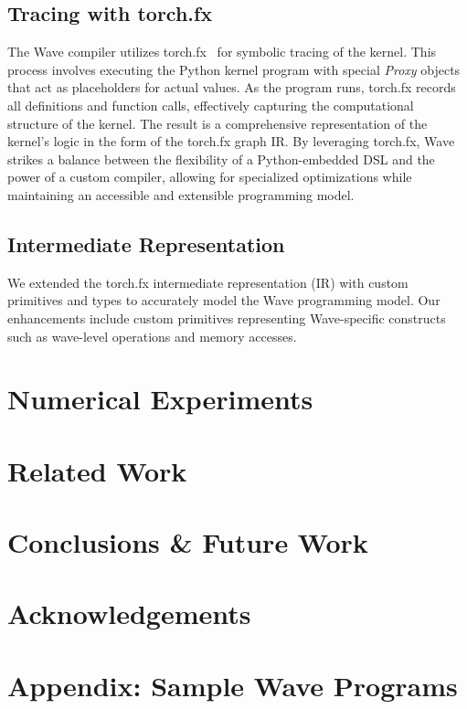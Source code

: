 \documentclass{article}
\begin{document}
\subsection{Tracing with torch.fx}

The Wave compiler utilizes torch.fx~\cite{reed2022torch} for symbolic tracing of the kernel. This process involves executing the Python kernel program with special \emph{Proxy} objects that act as placeholders for actual values. As the program runs, torch.fx records all definitions and function calls, effectively capturing the computational structure of the kernel. The result is a comprehensive representation of the kernel's logic in the form of the torch.fx graph IR. By leveraging torch.fx, Wave strikes a balance between the flexibility of a Python-embedded DSL and the power of a custom compiler, allowing for specialized optimizations while maintaining an accessible and extensible programming model.

\subsection{Intermediate Representation}
We extended the torch.fx intermediate representation (IR) with custom primitives and types to accurately model the Wave programming model. Our enhancements include custom primitives representing Wave-specific constructs such as wave-level operations and memory accesses.

\section{Numerical Experiments}
\label{section:numerical_experiments}

\section{Related Work}
\label{section:related_work}

\section{Conclusions \& Future Work}
\label{section:conclusions}

\section{Acknowledgements}
\label{section:acknowledgements}

\section{Appendix: Sample Wave Programs}
\label{section:samples}
\end{document}
